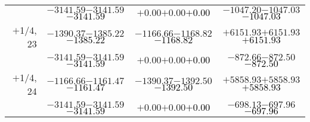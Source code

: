 \documentclass[compress]{beamer}
\begin{document}
\begin{frame}
{\begin{tabular}{r | c | c | c}
           & $-3141.59$\hspace{0.1 cm}$-3141.59$\hspace{0.1 cm}\textcolor{black}{$-3141.59$} & $+0.00$\hspace{0.1 cm}$+0.00$\hspace{0.1 cm}\textcolor{black}{$+0.00$} & $-1047.20$\hspace{0.1 cm}$-1047.03$\hspace{0.1 cm}\textcolor{black}{$-1047.03$} \\
$+$1/4, 23 & $-1390.37$\hspace{0.1 cm}$-1385.22$\hspace{0.1 cm}\textcolor{black}{$-1385.22$} & $-1166.66$\hspace{0.1 cm}$-1168.82$\hspace{0.1 cm}\textcolor{black}{$-1168.82$} & $+6151.93$\hspace{0.1 cm}$+6151.93$\hspace{0.1 cm}\textcolor{black}{$+6151.93$} \\
           & $-3141.59$\hspace{0.1 cm}$-3141.59$\hspace{0.1 cm}\textcolor{black}{$-3141.59$} & $+0.00$\hspace{0.1 cm}$+0.00$\hspace{0.1 cm}\textcolor{black}{$+0.00$} & $-872.66$\hspace{0.1 cm}$-872.50$\hspace{0.1 cm}\textcolor{black}{$-872.50$} \\
$+$1/4, 24 & $-1166.66$\hspace{0.1 cm}$-1161.47$\hspace{0.1 cm}\textcolor{black}{$-1161.47$} & $-1390.37$\hspace{0.1 cm}$-1392.50$\hspace{0.1 cm}\textcolor{black}{$-1392.50$} & $+5858.93$\hspace{0.1 cm}$+5858.93$\hspace{0.1 cm}\textcolor{black}{$+5858.93$} \\
           & $-3141.59$\hspace{0.1 cm}$-3141.59$\hspace{0.1 cm}\textcolor{black}{$-3141.59$} & $+0.00$\hspace{0.1 cm}$+0.00$\hspace{0.1 cm}\textcolor{black}{$+0.00$} & $-698.13$\hspace{0.1 cm}$-697.96$\hspace{0.1 cm}\textcolor{black}{$-697.96$} \\
\end{tabular}}
\end{frame}
\end{document}
